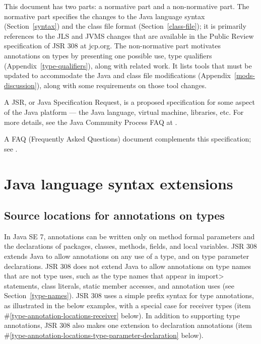 \documentclass[10pt]{article}
\begin{document}
This document has two parts:  a 
normative part and a 
non-normative part.
The normative part specifies the changes to
the Java language syntax (Section~\ref{syntax}) and
the class file format (Section~\ref{class-file}); it is primarily
references to the 
JLS and JVMS changes that are available in
the Public Review specification of JSR 308 at jcp.org.
%
The non-normative part
motivates annotations on types by presenting one
possible use, type qualifiers
(Appendix~\ref{type-qualifiers}), along with related work.
It lists tools that
must be updated to accommodate the Java and class file
modifications (Appendix~\ref{mods-discussion}), along with some
requirements on those tool changes.

A JSR, or Java Specification Request, is a proposed specification for some
aspect of the Java platform --- the Java language, virtual machine,
libraries, etc.  For more details, see the Java Community Process FAQ at
.


A FAQ (Frequently Asked Questions) document complements this specification;
see .



\section{Java language syntax extensions\label{syntax}}

\subsection{Source locations for annotations on types\label{type-annotation-locations}}

In Java SE 7, annotations can be written only on method formal parameters
and the declarations of packages, classes, methods, fields, and local variables.
JSR 308 extends Java to allow annotations on any use of a type, and
on type parameter declarations.  JSR 308 does not extend Java to allow
annotations on type names that are not type uses, such as the type names
that appear in \<import> statements, class literals, static member accesses,
and annotation uses (see Section~\ref{type-names}).
JSR 308 uses a simple prefix syntax for type annotations, as illustrated in
the below examples, with a special case
for receiver types (item \#\ref{type-annotation-locations-receiver} below).
In addition to supporting type annotations, JSR 308 also makes one
extension to declaration annotations (item
\#\ref{type-annotation-locations-type-parameter-declaration} below).
\end{document}
